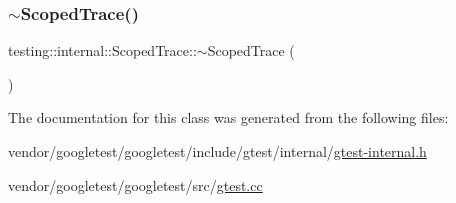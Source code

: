 \mbox{\label{classtesting_1_1internal_1_1_scoped_trace_a658c7c098ff48337058bfa2ccab65881}} 
\subsubsection{\texorpdfstring{$\sim$\+Scoped\+Trace()}{~ScopedTrace()}}
{\footnotesize\ttfamily testing\+::internal\+::\+Scoped\+Trace\+::$\sim$\+Scoped\+Trace (\begin{DoxyParamCaption}{ }\end{DoxyParamCaption})}



The documentation for this class was generated from the following files\+:\begin{DoxyCompactItemize}
\item 
vendor/googletest/googletest/include/gtest/internal/\hyperlink{gtest-internal_8h}{gtest-\/internal.\+h}\item 
vendor/googletest/googletest/src/\hyperlink{gtest_8cc}{gtest.\+cc}\end{DoxyCompactItemize}
